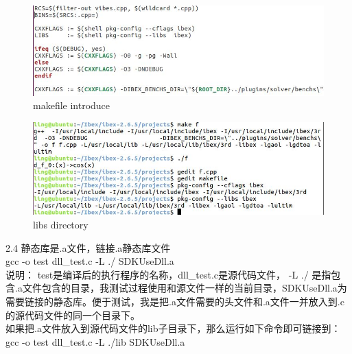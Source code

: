 \documentclass[UTF8]{ctexart}
\begin{document}
\begin{figure}
  \includegraphics[width=.8\linewidth]{makefile.JPG}
  \caption{makefile introduce}
  \label{fig:boat1}
\end{figure}

\begin{figure}
  \includegraphics[width=.8\linewidth]{libs.JPG}
  \caption{libs directory}
  \label{fig:boat1}
\end{figure}
2.4 静态库是.a文件，链接.a静态库文件\\
gcc -o test dll_test.c -L  ./  SDKUseDll.a \\

说明： test是编译后的执行程序的名称，dll_test.c是源代码文件， -L  ./   是指包含.a文件包含的目录，我测试过程使用和源文件一样的当前目录，SDKUseDll.a为需要链接的静态库。便于测试，我是把.a文件需要的头文件和.a文件一并放入到.c的源代码文件的同一个目录下。\\
 如果把.a文件放入到源代码文件的lib子目录下，那么运行如下命令即可链接到： \\
  gcc -o test dll_test.c -L  ./lib  SDKUseDll.a\\
  
\end{document}
